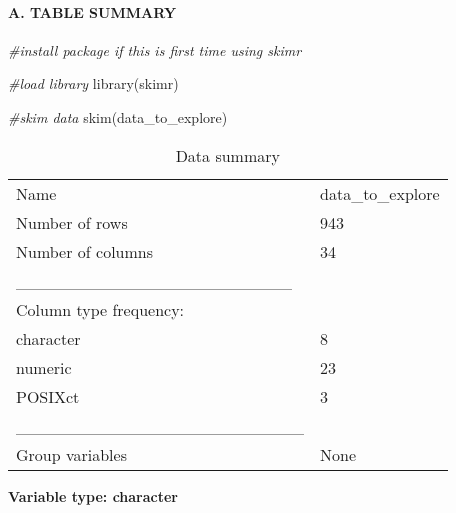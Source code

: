 \documentclass[
]{article}
\newenvironment{Shaded}{\begin{snugshade}}{\end{snugshade}}
\newcommand{\CommentTok}[1]{\textcolor[rgb]{0.56,0.35,0.01}{\textit{#1}}}
\newcommand{\FunctionTok}[1]{\textcolor[rgb]{0.00,0.00,0.00}{#1}}
\newcommand{\NormalTok}[1]{#1}
\begin{document}
\hypertarget{a.-table-summary}{%
\paragraph{A. TABLE SUMMARY}\label{a.-table-summary}}

\begin{Shaded}
\begin{Highlighting}[]
\CommentTok{\#install package if this is first time using skimr}


\CommentTok{\#load library}
\FunctionTok{library}\NormalTok{(skimr)}

\CommentTok{\#skim data}
\FunctionTok{skim}\NormalTok{(data\_to\_explore)}
\end{Highlighting}
\end{Shaded}

\begin{longtable}[]{@{}ll@{}}
\caption{Data summary}\tabularnewline
\toprule
\endhead
Name & data\_to\_explore \\
Number of rows & 943 \\
Number of columns & 34 \\
\_\_\_\_\_\_\_\_\_\_\_\_\_\_\_\_\_\_\_\_\_\_\_ & \\
Column type frequency: & \\
character & 8 \\
numeric & 23 \\
POSIXct & 3 \\
\_\_\_\_\_\_\_\_\_\_\_\_\_\_\_\_\_\_\_\_\_\_\_\_ & \\
Group variables & None \\
\bottomrule
\end{longtable}

\textbf{Variable type: character}
\end{document}

